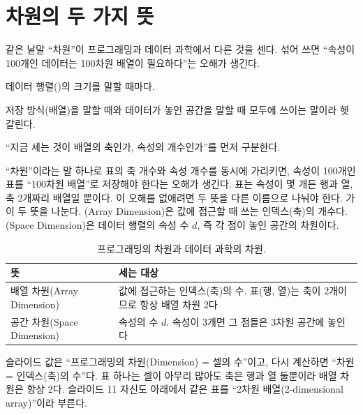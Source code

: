 \section{차원의 두 가지 뜻}
\label{sec:dimension}

\begin{inbrief}
  \item[Why] 같은 낱말 ``차원''이 프로그래밍과 데이터 과학에서 다른
             것을 센다. 섞어 쓰면 ``속성이 100개인 데이터는 100차원
             배열이 필요하다''는 오해가 생긴다.
  \item[When] 데이터 행렬()의 크기를 말할 때마다.
  \item[Where] 저장 방식(배열)을 말할 때와 데이터가 놓인 공간을 말할
               때 모두에 쓰이는 말이라 헷갈린다.
  \item[How] ``지금 세는 것이 배열의 축인가, 속성의 개수인가''를 먼저
             구분한다.
\end{inbrief}

``차원''이라는 말 하나로 표의 축 개수와 속성 개수를 동시에 가리키면,
속성이 100개인 표를 ``100차원 배열''로 저장해야 한다는 오해가 생긴다.
표는 속성이 몇 개든 행과 열, 축 2개짜리 배열일 뿐이다. 이 오해를
없애려면 두 뜻을 다른 이름으로 나눠야 한다. 가
이 두 뜻을 나눈다. (Array Dimension)은 값에 접근할
때 쓰는 인덱스(축)의 개수다. (Space Dimension)은
데이터 행렬의 속성 수 $d$, 즉 각 점이 놓인 공간의 차원이다.

\begin{table}[H]\centering
\caption{프로그래밍의 차원과 데이터 과학의 차원.}
\label{tab:attr-dimension-two-meanings}
\begin{tabularx}{\linewidth}{@{}l X@{}}
\toprule
뜻 & 세는 대상 \\
\midrule
배열 차원(Array Dimension) & 값에 접근하는 인덱스(축)의 수. 표(행,
  열)는 축이 2개이므로 항상 배열 차원 2다 \\
\midrule
공간 차원(Space Dimension) & 속성의 수 $d$. 속성이 3개면 그 점들은
  3차원 공간에 놓인다 \\
\bottomrule
\end{tabularx}
\end{table}

\begin{pitfall}[슬라이드 9: 차원 = 셀의 수?]
슬라이드 값은 ``프로그래밍의 차원(Dimension) = 셀의 수''이고, 다시
계산하면 ``차원 = 인덱스(축)의 수''다. 표 하나는 셀이 아무리 많아도
축은 행과 열 둘뿐이라 배열 차원은 항상 2다. 슬라이드 11 자신도 아래에서
같은 표를 ``2차원 배열(2-dimensional array)''이라 부른다.
\end{pitfall}

